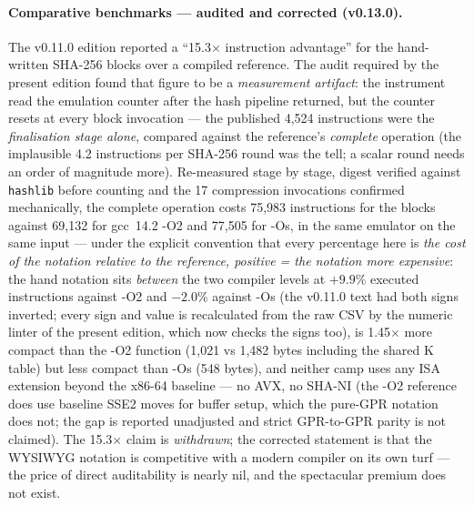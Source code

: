 \documentclass[11pt,a4paper]{article}
\newcommand{\code}[1]{\texttt{\small #1}}
\begin{document}
\paragraph{Comparative benchmarks --- audited and corrected (v0.13.0).} The
v0.11.0 edition reported a ``15.3$\times$ instruction advantage'' for
the hand-written SHA-256 blocks over a compiled reference. The audit
required by the present edition found that figure to be a \emph{measurement
artifact}: the instrument read the emulation counter after the hash
pipeline returned, but the counter resets at every block invocation ---
the published 4{,}524 instructions were the \emph{finalisation stage
alone}, compared against the reference's \emph{complete} operation (the
implausible 4.2 instructions per SHA-256 round was the tell; a scalar
round needs an order of magnitude more). Re-measured stage by stage,
digest verified against \code{hashlib} before counting and the 17
compression invocations confirmed mechanically, the complete operation
costs 75{,}983 instructions for the blocks against 69{,}132 for
gcc~14.2 -O2 and 77{,}505 for -Os, in the same emulator on the same
input --- under the explicit convention that every percentage here is
\emph{the cost of the notation relative to the reference, positive =
the notation more expensive}: the hand notation sits \emph{between}
the two compiler levels at $+9.9\%$ executed instructions against -O2
and $-2.0\%$ against -Os (the v0.11.0 text had both signs inverted;
every sign and value is recalculated from the raw CSV by the numeric
linter of the present edition, which now checks the signs too), is
1.45$\times$ more compact than the -O2 function (1{,}021 vs 1{,}482
bytes including the shared K table) but less compact than -Os (548
bytes), and neither camp uses any ISA extension beyond the x86-64
baseline --- no AVX, no SHA-NI (the -O2 reference does use baseline SSE2
moves for buffer setup, which the pure-GPR notation does not; the gap
is reported unadjusted and strict GPR-to-GPR parity is not claimed).
The 15.3$\times$ claim is \emph{withdrawn}; the corrected statement is
that the WYSIWYG notation is competitive with a modern compiler on its
own turf --- the price of direct auditability is nearly nil, and the
spectacular premium does not exist.
\end{document}

